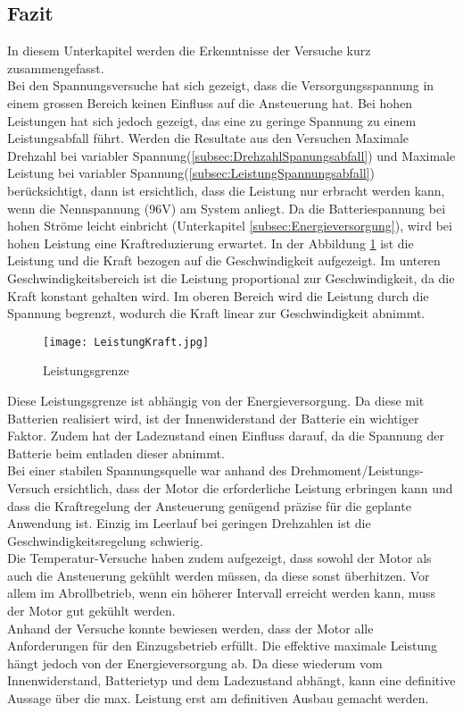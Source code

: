 \subsection{Fazit}\label{subsec:Fazit}
In diesem Unterkapitel werden die Erkenntnisse der Versuche kurz zusammengefasst.\\

Bei den Spannungsversuche hat sich gezeigt, dass die Versorgungsspannung in einem grossen Bereich keinen Einfluss auf die Ansteuerung hat. Bei hohen Leistungen hat sich jedoch gezeigt, das eine zu geringe Spannung zu einem Leistungsabfall führt. Werden die Resultate aus den Versuchen \glqq Maximale Drehzahl bei variabler Spannung\grqq (\ref{subsec:DrehzahlSpanungsabfall}) und \glqq Maximale Leistung bei variabler Spannung\grqq (\ref{subsec:LeistungSpannungsabfall}) berücksichtigt, dann ist ersichtlich, dass die Leistung nur erbracht werden kann, wenn die Nennspannung (96V) am System anliegt. Da die Batteriespannung bei hohen Ströme leicht einbricht (Unterkapitel \ref{subsec:Energieversorgung}), wird bei hohen Leistung eine Kraftreduzierung erwartet. In der Abbildung \ref{fig:LeistungKraft} ist die Leistung und die Kraft bezogen auf die Geschwindigkeit aufgezeigt. Im unteren Geschwindigkeitsbereich ist die Leistung proportional zur Geschwindigkeit, da die Kraft konstant gehalten wird. Im oberen Bereich wird die Leistung durch die Spannung begrenzt, wodurch die Kraft linear zur Geschwindigkeit abnimmt.

\begin{figure}[H]
	\centering
	\texttt{[image: LeistungKraft.jpg]}
	\caption{Leistungsgrenze}\label{fig:LeistungKraft}
\end{figure}

Diese Leistungsgrenze ist abhängig von der Energieversorgung. Da diese mit Batterien realisiert wird, ist der Innenwiderstand der Batterie ein wichtiger Faktor. Zudem hat der Ladezustand einen Einfluss darauf, da die Spannung der Batterie beim entladen dieser abnimmt.\\
Bei einer stabilen Spannungsquelle war anhand des Drehmoment/Leistungs-Versuch ersichtlich, dass der Motor die erforderliche Leistung erbringen kann und dass die Kraftregelung der Ansteuerung genügend präzise für die geplante Anwendung ist. Einzig im Leerlauf bei geringen Drehzahlen ist die Geschwindigkeitsregelung schwierig.\\
Die Temperatur-Versuche haben zudem aufgezeigt, dass sowohl der Motor als auch die Ansteuerung gekühlt werden müssen, da diese sonst überhitzen. Vor allem im Abrollbetrieb, wenn ein höherer Intervall erreicht werden kann, muss der Motor gut gekühlt werden.\\
Anhand der Versuche konnte bewiesen werden, dass der Motor alle Anforderungen für den Einzugsbetrieb erfüllt. Die effektive maximale Leistung hängt jedoch von der Energieversorgung ab. Da diese wiederum vom Innenwiderstand, Batterietyp und dem Ladezustand abhängt, kann eine definitive Aussage über die max. Leistung erst am definitiven Ausbau gemacht werden.